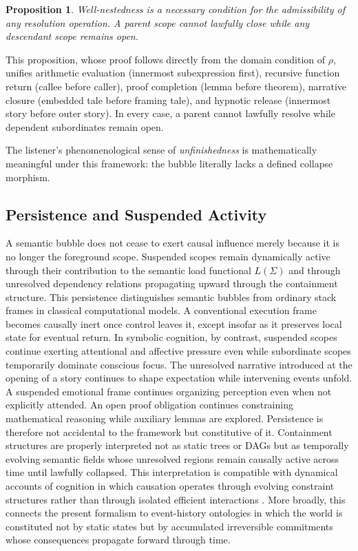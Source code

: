 \documentclass[12pt, a4paper]{article}
\theoremstyle{plain}
\newtheorem{proposition}[theorem]{Proposition}
\theoremstyle{definition}
\theoremstyle{remark}
\begin{document}
\begin{proposition}
Well-nestedness is a necessary condition for the admissibility of any
resolution operation. A parent scope cannot lawfully close while any
descendant scope remains open.
\end{proposition}

This proposition, whose proof follows directly from the domain condition of
$\rho$, unifies arithmetic evaluation (innermost subexpression first),
recursive function return (callee before caller), proof completion (lemma
before theorem), narrative closure (embedded tale before framing tale), and
hypnotic release (innermost story before outer story). In every case, a
parent cannot lawfully resolve while dependent subordinates remain open.

The listener's phenomenological sense of \emph{unfinishedness} is
mathematically meaningful under this framework: the bubble literally lacks a
defined collapse morphism.

\subsection{Persistence and Suspended Activity}

A semantic bubble does not cease to exert causal influence merely because it
is no longer the foreground scope. Suspended scopes remain dynamically active
through their contribution to the semantic load functional $L(\Sigma)$ and
through unresolved dependency relations propagating upward through the
containment structure. This persistence distinguishes semantic bubbles from
ordinary stack frames in classical computational models. A conventional
execution frame becomes causally inert once control leaves it, except insofar
as it preserves local state for eventual return. In symbolic cognition, by
contrast, suspended scopes continue exerting attentional and affective
pressure even while subordinate scopes temporarily dominate conscious focus.
The unresolved narrative introduced at the opening of a story continues to
shape expectation while intervening events unfold. A suspended emotional frame
continues organizing perception even when not explicitly attended. An open
proof obligation continues constraining mathematical reasoning while auxiliary
lemmas are explored. Persistence is therefore not accidental to the framework
but constitutive of it. Containment structures are properly interpreted not as
static trees or DAGs but as temporally evolving semantic fields whose
unresolved regions remain causally active across time until lawfully collapsed.
This interpretation is compatible with dynamical accounts of cognition in which
causation operates through evolving constraint structures rather than through
isolated efficient interactions \cite{Juarrero1999}. More broadly, this connects
the present formalism to event-history ontologies in which the world is
constituted not by static states but by accumulated irreversible commitments
whose consequences propagate forward through time.
\end{document}
